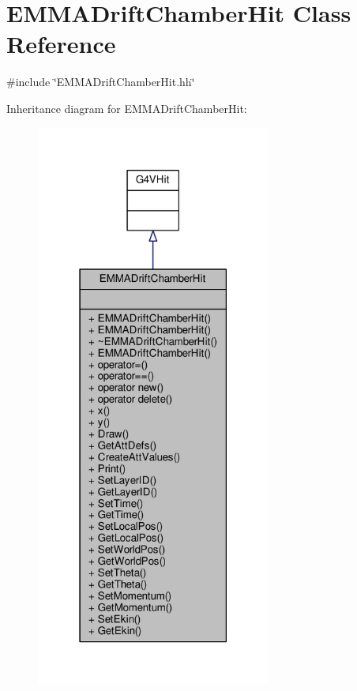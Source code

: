 \hypertarget{classEMMADriftChamberHit}{}\section{E\+M\+M\+A\+Drift\+Chamber\+Hit Class Reference}
\label{classEMMADriftChamberHit}


{\ttfamily \#include \char`\"{}E\+M\+M\+A\+Drift\+Chamber\+Hit.\+hh\char`\"{}}



Inheritance diagram for E\+M\+M\+A\+Drift\+Chamber\+Hit\+:
\nopagebreak
\begin{figure}[H]
\begin{center}
\leavevmode
\includegraphics[width=219pt]{classEMMADriftChamberHit__inherit__graph}
\end{center}
\end{figure}


